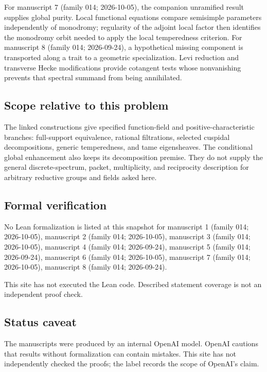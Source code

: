 \documentclass[11pt]{article}
\begin{document}
For manuscript 7 (family 014; 2026-10-05), the companion unramified result supplies global purity. Local functional equations compare semisimple parameters independently of monodromy; regularity of the adjoint local factor then identifies the monodromy orbit needed to apply the local temperedness criterion. For manuscript 8 (family 014; 2026-09-24), a hypothetical missing component is transported along a trait to a geometric specialization. Levi reduction and transverse Hecke modifications provide cotangent tests whose nonvanishing prevents that spectral summand from being annihilated.

\subsection{Scope relative to this problem}
The linked constructions give specified function-field and positive-characteristic branches: full-support equivalence, rational filtrations, selected cuspidal decompositions, generic temperedness, and tame eigensheaves. The conditional global enhancement also keeps its decomposition premise. They do not supply the general discrete-spectrum, packet, multiplicity, and reciprocity description for arbitrary reductive groups and fields asked here.

\subsection{Formal verification}
No Lean formalization is listed at this snapshot for manuscript 1 (family 014; 2026-10-05), manuscript 2 (family 014; 2026-10-05), manuscript 3 (family 014; 2026-10-05), manuscript 4 (family 014; 2026-09-24), manuscript 5 (family 014; 2026-09-24), manuscript 6 (family 014; 2026-10-05), manuscript 7 (family 014; 2026-10-05), manuscript 8 (family 014; 2026-09-24).

This site has not executed the Lean code. Described statement coverage is not an independent proof check.

\subsection{Status caveat}
The manuscripts were produced by an internal OpenAI model. OpenAI cautions that results without formalization can contain mistakes. This site has not independently checked the proofs; the label records the scope of OpenAI's claim.
\end{document}
